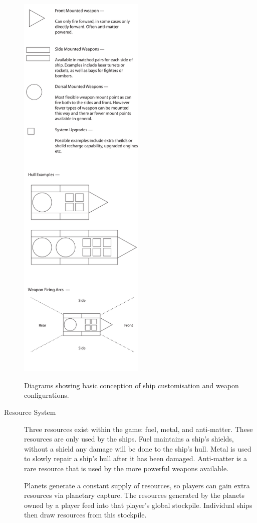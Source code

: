 \begin{description}
\begin{marginfigure}
	\includegraphics[width=6cm]{res/ship_design}
	\caption{Diagrams showing basic conception of ship customisation and weapon configurations. }
	\label{fig:ship_design}
\end{marginfigure}


	\item[Resource System]

	Three resources exist within the game: fuel, metal, and anti-matter. These resources are only used by the ships. Fuel maintains a ship's shields, without a shield any damage will be done to the ship's hull. Metal is used to slowly repair a ship's hull after it has been damaged. Anti-matter is a rare resource that is used by the more powerful weapons available.

	Planets generate a constant supply of resources, so players can gain extra resources via planetary capture. The resources generated by the planets owned by a player feed into that player's global stockpile. Individual ships then draw resources from this stockpile.


\end{description}
